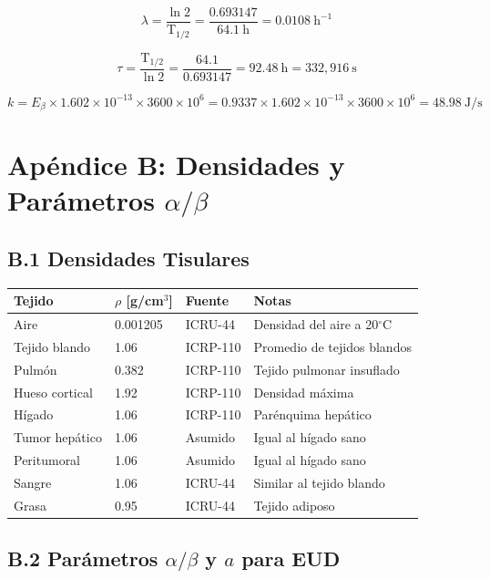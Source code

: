 \documentclass[12pt,a4paper]{article}
\begin{document}
$$\lambda = \frac{\ln 2}{\text{T}_{1/2}} = \frac{0.693147}{64.1\ \text{h}} = 0.0108\ \text{h}^{-1}$$

$$\tau = \frac{\text{T}_{1/2}}{\ln 2} = \frac{64.1}{0.693147} = 92.48\ \text{h} = 332,916\ \text{s}$$

$$k = E_{\beta} \times 1.602\times10^{-13} \times 3600 \times 10^6 = 0.9337 \times 1.602\times10^{-13} \times 3600 \times 10^6 = 48.98\ \text{J/s}$$

\newpage

\section*{Apéndice B: Densidades y Parámetros $\alpha/\beta$}

\subsection*{B.1 Densidades Tisulares}

\begin{tabular}{p{4cm} p{3cm} p{2.5cm} p{4cm}}
\toprule
\textbf{Tejido} & $\rho$ [g/cm$^3$] & \textbf{Fuente} & \textbf{Notas} \\
\midrule
Aire & 0.001205 & ICRU-44 & Densidad del aire a 20$^\circ$C \\
Tejido blando & 1.06 & ICRP-110 & Promedio de tejidos blandos \\
Pulmón & 0.382 & ICRP-110 & Tejido pulmonar insuflado \\
Hueso cortical & 1.92 & ICRP-110 & Densidad máxima \\
Hígado & 1.06 & ICRP-110 & Parénquima hepático \\
Tumor hepático & 1.06 & Asumido & Igual al hígado sano \\
Peritumoral & 1.06 & Asumido & Igual al hígado sano \\
Sangre & 1.06 & ICRU-44 & Similar al tejido blando \\
Grasa & 0.95 & ICRU-44 & Tejido adiposo \\
\bottomrule
\end{tabular}

\subsection*{B.2 Parámetros $\alpha/\beta$ y $a$ para EUD}
\end{document}
